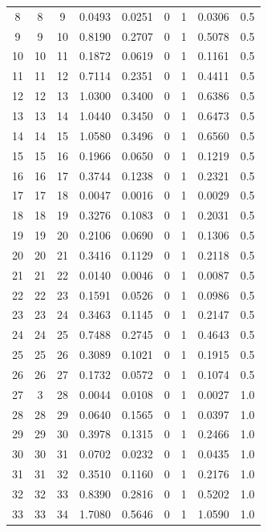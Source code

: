 \begin{longtable}{ccccccccc}
	8 & 8 & 9 & 0.0493 & 0.0251 & 0 & 1 & 0.0306 & 0.5 \\
	
	9 & 9 & 10 & 0.8190 & 0.2707 & 0 & 1 & 0.5078 & 0.5 \\
	10 & 10 & 11 & 0.1872 & 0.0619 & 0 & 1 & 0.1161 & 0.5 \\
	11 & 11 & 12 & 0.7114 & 0.2351 & 0 & 1 & 0.4411 & 0.5 \\
	12 & 12 & 13 & 1.0300 & 0.3400 & 0 & 1 & 0.6386 & 0.5 \\
	13 & 13 & 14 & 1.0440 & 0.3450 & 0 & 1 & 0.6473 & 0.5 \\
	14 & 14 & 15 & 1.0580 & 0.3496 & 0 & 1 & 0.6560 & 0.5 \\
	15 & 15 & 16 & 0.1966 & 0.0650 & 0 & 1 & 0.1219 & 0.5 \\
	16 & 16 & 17 & 0.3744 & 0.1238 & 0 & 1 & 0.2321 & 0.5 \\
	17 & 17 & 18 & 0.0047 & 0.0016 & 0 & 1 & 0.0029 & 0.5 \\
	18 & 18 & 19 & 0.3276 & 0.1083 & 0 & 1 & 0.2031 & 0.5 \\
	19 & 19 & 20 & 0.2106 & 0.0690 & 0 & 1 & 0.1306 & 0.5 \\
	20 & 20 & 21 & 0.3416 & 0.1129 & 0 & 1 & 0.2118 & 0.5 \\
	21 & 21 & 22 & 0.0140 & 0.0046 & 0 & 1 & 0.0087 & 0.5 \\
	22 & 22 & 23 & 0.1591 & 0.0526 & 0 & 1 & 0.0986 & 0.5 \\
	23 & 23 & 24 & 0.3463 & 0.1145 & 0 & 1 & 0.2147 & 0.5 \\
	24 & 24 & 25 & 0.7488 & 0.2745 & 0 & 1 & 0.4643 & 0.5 \\
	25 & 25 & 26 & 0.3089 & 0.1021 & 0 & 1 & 0.1915 & 0.5 \\
	26 & 26 & 27 & 0.1732 & 0.0572 & 0 & 1 & 0.1074 & 0.5 \\
	27 & 3 & 28 & 0.0044 & 0.0108 & 0 & 1 & 0.0027 & 1.0 \\
	28 & 28 & 29 & 0.0640 & 0.1565 & 0 & 1 & 0.0397 & 1.0 \\
	29 & 29 & 30 & 0.3978 & 0.1315 & 0 & 1 & 0.2466 & 1.0 \\
	30 & 30 & 31 & 0.0702 & 0.0232 & 0 & 1 & 0.0435 & 1.0 \\
	31 & 31 & 32 & 0.3510 & 0.1160 & 0 & 1 & 0.2176 & 1.0 \\
	32 & 32 & 33 & 0.8390 & 0.2816 & 0 & 1 & 0.5202 & 1.0 \\
	33 & 33 & 34 & 1.7080 & 0.5646 & 0 & 1 & 1.0590 & 1.0 \\

\end{longtable}
